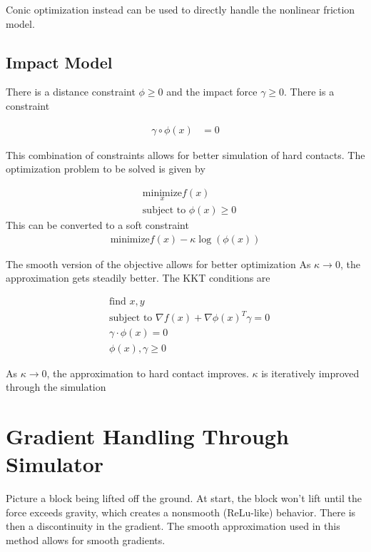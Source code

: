 \documentclass[book.tex]{subfiles}
\begin{document}
Conic optimization instead can be used to directly handle the nonlinear friction model.

\subsection{Impact Model}

There is a distance constraint $\phi \geq 0$ and the impact force $\gamma \geq 0$. There is a constraint

\begin{align}
    \gamma \circ \phi(x) &= 0
\end{align}

This combination of constraints allows for better simulation of hard contacts. The optimization problem to be solved is given by

\begin{align}
   & \underset{x}{\textrm{minimize}} f(x) \\
   & \textrm{subject to } \phi(x) \geq 0
\end{align}
This can be converted to a soft constraint
\begin{align}
    \textrm{minimize} f(x) - \kappa \log(\phi(x))
\end{align}

The smooth version of the objective allows for better optimization %
As $\kappa \to 0$, the approximation gets steadily better. The KKT conditions are

\begin{align}
   & \textrm{find } x, y \\
   & \textrm{subject to }  \nabla f(x) + \nabla \phi(x)^T \gamma = 0 \\
   & \gamma \cdot \phi(x) = 0 \\
   & \phi(x), \gamma \geq 0
\end{align}

As $\kappa \to 0$, the approximation to hard contact improves. $\kappa$ is iteratively improved through the simulation

\section{Gradient Handling Through Simulator}

Picture a block being lifted off the ground. At start, the block won't lift until the force exceeds gravity, which creates a nonsmooth (ReLu-like) behavior. There is then a discontinuity in the gradient. %
The smooth approximation used in this method allows for smooth gradients.
\end{document}
